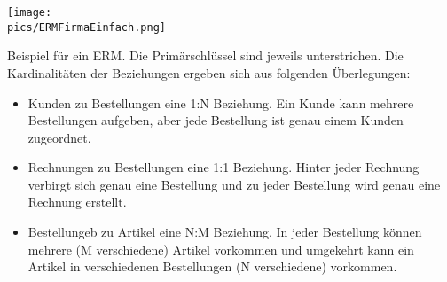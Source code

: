 \begin{minipage}{\textwidth}
	\centering\texttt{[image: \\pics/ERMFirmaEinfach.png]}
\end{minipage}

Beispiel für ein ERM. Die Primärschlüssel sind jeweils unterstrichen. Die Kardinalitäten der Beziehungen ergeben sich aus folgenden Überlegungen:
\begin{itemize}
	\item Kunden zu Bestellungen eine 1:N Beziehung. Ein Kunde kann mehrere Bestellungen aufgeben, aber jede Bestellung ist genau einem Kunden zugeordnet.
	\item Rechnungen zu Bestellungen eine 1:1 Beziehung. Hinter jeder Rechnung verbirgt sich genau eine Bestellung und zu jeder Bestellung wird genau eine Rechnung erstellt.
	\item Bestellungeb zu Artikel eine N:M Beziehung. In jeder Bestellung können mehrere (M verschiedene) Artikel vorkommen und umgekehrt kann ein Artikel in verschiedenen Bestellungen (N verschiedene) vorkommen.
\end{itemize}
\begin{Exercise}[title=Vervollständige die ERMs aus Aufgabe \ref{ERMErstellen1}. Jeder Entitätstyp muss einen Primärschlüssel haben und ergänze die Kardinalitäten., label=ERMErstellen2]
	\phantom{ }
\end{Exercise}
